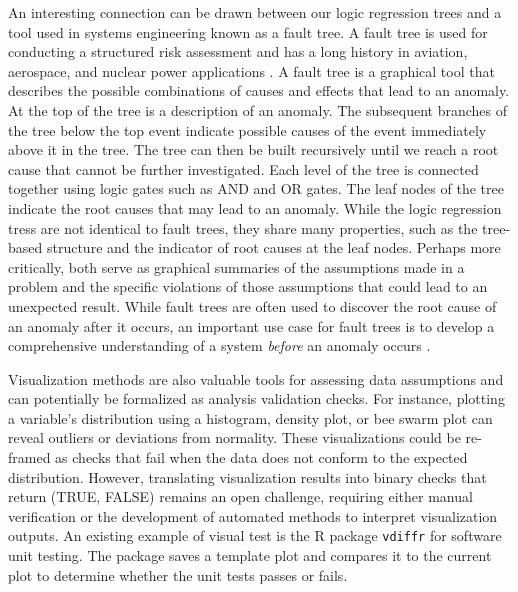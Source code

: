 \documentclass[
  12pt,
]{interact}
\begin{document}
An interesting connection can be drawn between our logic regression
trees and a tool used in systems engineering known as a fault tree. A
fault tree is used for conducting a structured risk assessment and has a
long history in aviation, aerospace, and nuclear power applications
\citep{vesely1981fault}. A fault tree is a graphical tool that describes
the possible combinations of causes and effects that lead to an anomaly.
At the top of the tree is a description of an anomaly. The subsequent
branches of the tree below the top event indicate possible causes of the
event immediately above it in the tree. The tree can then be built
recursively until we reach a root cause that cannot be further
investigated. Each level of the tree is connected together using logic
gates such as AND and OR gates. The leaf nodes of the tree indicate the
root causes that may lead to an anomaly. While the logic regression
tress are not identical to fault trees, they share many properties, such
as the tree-based structure and the indicator of root causes at the leaf
nodes. Perhaps more critically, both serve as graphical summaries of the
assumptions made in a problem and the specific violations of those
assumptions that could lead to an unexpected result. While fault trees
are often used to discover the root cause of an anomaly after it occurs,
an important use case for fault trees is to develop a comprehensive
understanding of a system \emph{before} an anomaly occurs
\citep{michael2002fault}.

Visualization methods are also valuable tools for assessing data
assumptions and can potentially be formalized as analysis validation
checks. For instance, plotting a variable's distribution using a
histogram, density plot, or bee swarm plot can reveal outliers or
deviations from normality. These visualizations could be re-framed as
checks that fail when the data does not conform to the expected
distribution. However, translating visualization results into binary
checks that return (TRUE, FALSE) remains an open challenge, requiring
either manual verification or the development of automated methods to
interpret visualization outputs. An existing example of visual test is
the R package \texttt{vdiffr} \citep{vdiffr} for software unit testing.
The package saves a template plot and compares it to the current plot to
determine whether the unit tests passes or fails.
\end{document}
